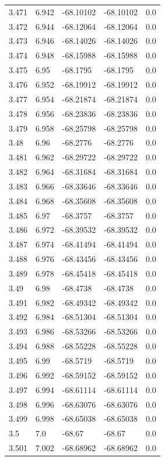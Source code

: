 \begin{tabular}{lllll}
3.471 & 6.942 & -68.10102 & -68.10102 & 0.0 \\
3.472 & 6.944 & -68.12064 & -68.12064 & 0.0 \\
3.473 & 6.946 & -68.14026 & -68.14026 & 0.0 \\
3.474 & 6.948 & -68.15988 & -68.15988 & 0.0 \\
3.475 & 6.95 & -68.1795 & -68.1795 & 0.0 \\
3.476 & 6.952 & -68.19912 & -68.19912 & 0.0 \\
3.477 & 6.954 & -68.21874 & -68.21874 & 0.0 \\
3.478 & 6.956 & -68.23836 & -68.23836 & 0.0 \\
3.479 & 6.958 & -68.25798 & -68.25798 & 0.0 \\
3.48 & 6.96 & -68.2776 & -68.2776 & 0.0 \\
3.481 & 6.962 & -68.29722 & -68.29722 & 0.0 \\
3.482 & 6.964 & -68.31684 & -68.31684 & 0.0 \\
3.483 & 6.966 & -68.33646 & -68.33646 & 0.0 \\
3.484 & 6.968 & -68.35608 & -68.35608 & 0.0 \\
3.485 & 6.97 & -68.3757 & -68.3757 & 0.0 \\
3.486 & 6.972 & -68.39532 & -68.39532 & 0.0 \\
3.487 & 6.974 & -68.41494 & -68.41494 & 0.0 \\
3.488 & 6.976 & -68.43456 & -68.43456 & 0.0 \\
3.489 & 6.978 & -68.45418 & -68.45418 & 0.0 \\
3.49 & 6.98 & -68.4738 & -68.4738 & 0.0 \\
3.491 & 6.982 & -68.49342 & -68.49342 & 0.0 \\
3.492 & 6.984 & -68.51304 & -68.51304 & 0.0 \\
3.493 & 6.986 & -68.53266 & -68.53266 & 0.0 \\
3.494 & 6.988 & -68.55228 & -68.55228 & 0.0 \\
3.495 & 6.99 & -68.5719 & -68.5719 & 0.0 \\
3.496 & 6.992 & -68.59152 & -68.59152 & 0.0 \\
3.497 & 6.994 & -68.61114 & -68.61114 & 0.0 \\
3.498 & 6.996 & -68.63076 & -68.63076 & 0.0 \\
3.499 & 6.998 & -68.65038 & -68.65038 & 0.0 \\
3.5 & 7.0 & -68.67 & -68.67 & 0.0 \\
3.501 & 7.002 & -68.68962 & -68.68962 & 0.0 \\

\end{tabular}
